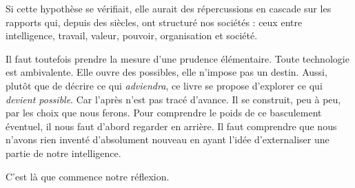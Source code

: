 Si cette hypothèse se vérifiait, elle aurait des répercussions en cascade sur les rapports qui, depuis des siècles, ont structuré nos sociétés : ceux entre intelligence, travail, valeur, pouvoir, organisation et société.

Il faut toutefois prendre la mesure d'une prudence élémentaire. Toute technologie est ambivalente. Elle ouvre des possibles, elle n'impose pas un destin. Aussi, plutôt que de décrire ce qui \emph{adviendra}, ce livre se propose d'explorer ce qui \emph{devient possible}. Car l'après n'est pas tracé d'avance. Il se construit, peu à peu, par les choix que nous ferons. Pour comprendre le poids de ce basculement éventuel, il nous faut d'abord regarder en arrière. Il faut comprendre que nous n'avons rien inventé d'absolument nouveau en ayant l'idée d'externaliser une partie de notre intelligence.

C'est là que commence notre réflexion.
